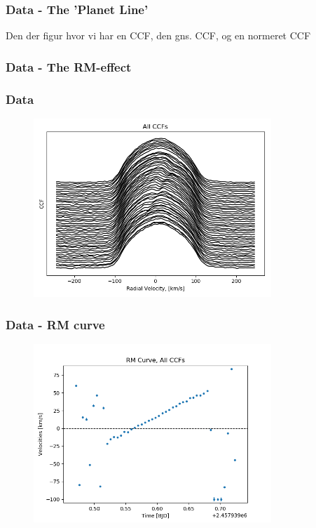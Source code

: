 \documentclass[show notes]{beamer}
\begin{document}
\begin{frame}
\frametitle{Data - The 'Planet Line'}

Den der figur hvor vi har en CCF, den gns. CCF, og en normeret CCF

\end{frame}

\begin{frame}
\frametitle{Data - The RM-effect}
	\begin{figure}
	\centering
	\label{fig:colormap}
\end{figure}
\end{frame}


\begin{frame}
\frametitle{Data}
	\begin{figure}
	\centering
	\includegraphics[width=0.8\textwidth]{All_CCFs.png}
	\label{fig:all_ccfs}
\end{figure}
\end{frame}

\begin{frame}
\frametitle{Data - RM curve}
	\begin{figure}
		\centering
		\includegraphics[width=0.8\textwidth]{RM_all_CCFs.png}
		\label{fig:RM_all_CCFs}
	\end{figure}
\end{frame}
\end{document}

